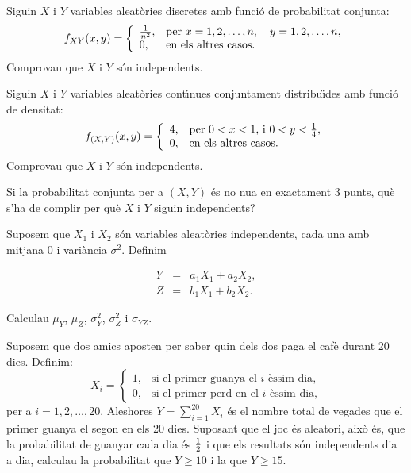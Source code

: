 \begin{prob}
{Siguin
$X$ i $Y$ variables aleat\`ories discretes amb funci\'o de probabilitat
conjunta: $$f_{XY}(x,y)=
\left\{\begin{array}{ll}
{1\over n^2}, & \text{per $x=1,2,\ldots,n,\quad
y=1,2,\ldots,n$},\\
0, & \text{en els altres casos.}
\end{array}\right.
$$Comprovau que $X$ i $Y$ s\'on
independents.} 
\end{prob}

\begin{prob}
{Siguin $X$
i $Y$ variables aleat\`ories cont\'{\i}nues conjuntament distribu\"{\i}des amb
funci\'o de
densitat: $$f_{(X,Y)} (x,y)=
\left\{\begin{array}{ll}
4, & \text{per $0<x<1,$ i $0<y<{1\over 4}$},\\ 0, & \text{en
els altres casos.}
\end{array}\right.
$$Comprovau que $X$ i $Y$ s\'on independents.} 
\end{prob}

\begin{prob}
{Si la
probabilitat conjunta per a $(X,Y)$ \'es no nu{\lgem}a en exactament 3 punts, qu\`e
s'ha de
complir per qu\`e $X$ i $Y$ siguin independents?} 
\end{prob}

\begin{prob}
{Suposem que $X_1$ i $X_2$ s\'on variables aleat\`ories independents, cada
una amb mitjana $0$ i vari\`ancia $\sigma^2$. Definim

\begin{eqnarray*}
	Y & = & a_1 X_1 + a_2 X_2,  \\
	Z & = & b_1 X_1+b_2 X_2.
\end{eqnarray*}

Calculau $\mu_Y$,
$\mu_Z$, $\sigma_Y^2$, $\sigma_Z^2$ i $\sigma_{YZ}$.}
\end{prob}

\begin{prob}
{Suposem que dos amics aposten per saber quin dels dos paga el caf\`e
durant 20 dies. Definim:
$$X_i=
\left\{\begin{array}{ll}
1, & \text{si el primer guanya el $i$-\`essim dia},\\
0, & \text{si el primer
perd en el $i$-\`essim dia,}
\end{array}\right.
$$per a $i=1,2,\ldots,20$. Aleshores
$Y=\sum\limits_{i=1}^{20}X_i$ \'es el nombre total de vegades que el primer
guanya el segon en els 20 dies. Suposant que el joc \'es aleatori, aix\`o \'es,
que
la probabilitat de guanyar cada dia \'es ${1\over 2}$ i que els resultats
s\'on
independents dia a dia, calculau la probabilitat que $Y\geq 10$ i la que
$Y\geq 15$.}
\end{prob}

